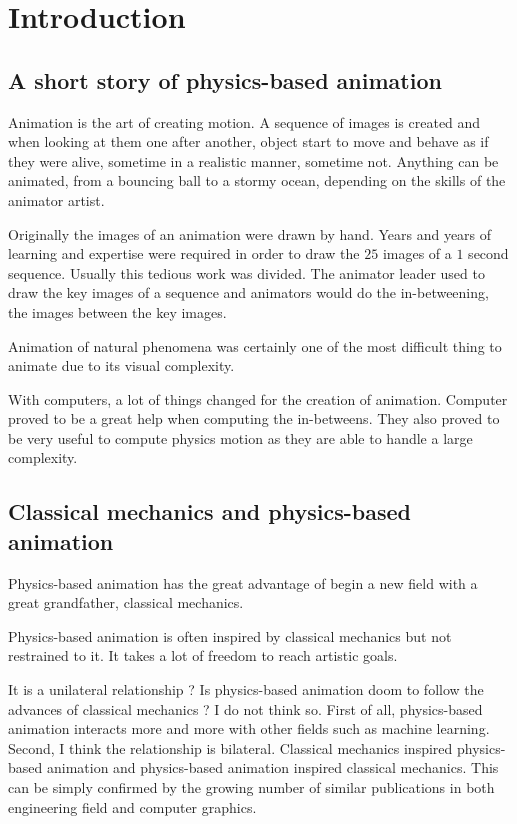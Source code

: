 \documentclass[11pt, oneside, a4paper]{memoir}
\begin{document}
\tableofcontents

\mainmatter

\chapter{Introduction}
\label{chap:introdution}

\section{A short story of physics-based animation}
Animation is the art of creating motion. A sequence of images is created and when looking at them one after another, object start to move and behave as if they were alive, sometime in a realistic manner, sometime not. Anything can be animated, from a bouncing ball to a stormy ocean, depending on the skills of the animator artist.

Originally the images of an animation were drawn by hand. Years and years of learning and expertise were required in order to draw the $25$ images of a $1$ second sequence. Usually this tedious work was divided. The animator leader used to draw the key images of a sequence and animators would  do the in-betweening, the images between the key images.

Animation of natural phenomena was certainly one of the most difficult thing to animate due to its visual complexity.

With computers, a lot of things changed for the creation of animation. Computer proved to be a great help when computing the in-betweens. They also proved to be very useful to compute physics motion as they are able to handle a large complexity.

\section{Classical mechanics and physics-based animation}
Physics-based animation has the great advantage of begin a new field with a great grandfather, classical mechanics.

Physics-based animation is often inspired by classical mechanics but not restrained to it. It takes a lot of freedom to reach artistic goals.

It is a unilateral relationship ? Is physics-based animation doom to follow the advances of classical mechanics ? I do not think so. First of all, physics-based animation interacts more and more with other fields such as machine learning. Second, I think the relationship is bilateral. Classical mechanics inspired physics-based animation and physics-based animation inspired classical mechanics. This can be simply confirmed by the growing number of similar publications in both engineering field and computer graphics.
\end{document}
